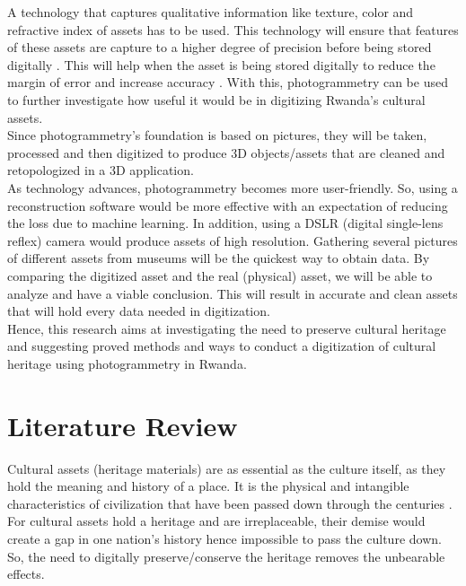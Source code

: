 \documentclass[conference]{IEEEtran}
\begin{document}
A technology that captures qualitative information like texture, color and refractive index of assets has to be used. This technology will ensure that features
of these assets are capture to a higher degree of precision before being stored digitally \cite{Linder2006}. This will help when
the asset is being stored digitally to reduce the margin of error and increase accuracy \cite{accphtgm}. With this, photogrammetry can be used to further
investigate how useful it would be in digitizing Rwanda's cultural assets. \\

Since photogrammetry's foundation is based on pictures, they will be taken, processed and then digitized to produce 3D objects/assets that are cleaned and retopologized in
a 3D application. \\

As technology advances, photogrammetry becomes more user-friendly. So, using a reconstruction software
would be more effective with an expectation of reducing the loss due to machine learning. In addition, using a DSLR (digital single-lens reflex) camera would produce assets of
high resolution. Gathering several pictures of different assets from museums will be the quickest way to obtain data. By comparing the digitized
asset and the real (physical) asset, we will be able to analyze and have a viable conclusion. This will result in accurate and clean assets that will
hold every data needed in digitization. \\

Hence, this research aims at investigating the need to preserve cultural heritage and suggesting proved methods and ways to conduct a digitization of cultural heritage using
photogrammetry in Rwanda.

\section{\textbf{Literature Review}}
Cultural assets (heritage materials) are as essential as the culture itself, as they hold the meaning and history of a place.
It is the physical and intangible characteristics of civilization that have been passed down through the centuries \cite{WILLIS2014145}. For cultural assets hold a heritage
and are irreplaceable, their demise would create a gap in one nation's history hence impossible to pass the culture down.
So, the need to digitally preserve/conserve the heritage removes the unbearable effects. \\
\end{document}
